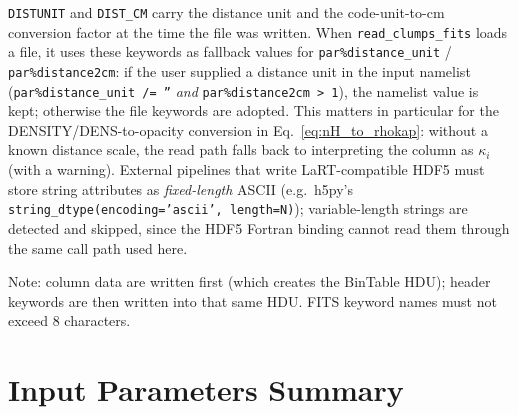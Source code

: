 \documentclass[english,a4paper]{my_memo}
\begin{document}
\texttt{DISTUNIT} and \texttt{DIST\_CM} carry the distance unit and the
code-unit-to-cm conversion factor at the time the file was written.  When
\texttt{read\_clumps\_fits} loads a file, it uses these keywords as
fallback values for \texttt{par\%distance\_unit} / \texttt{par\%distance2cm}:
if the user supplied a distance unit in the input namelist
(\texttt{par\%distance\_unit /= ''} \emph{and} \texttt{par\%distance2cm > 1}),
the namelist value is kept; otherwise the file keywords are adopted.  This
matters in particular for the DENSITY/DENS-to-opacity conversion in
Eq.~\ref{eq:nH_to_rhokap}: without a known distance scale, the read path
falls back to interpreting the column as $\kappa_i$ (with a warning).
External pipelines that write LaRT-compatible HDF5 must store string
attributes as \emph{fixed-length} ASCII (e.g.\ h5py's
\texttt{string\_dtype(encoding='ascii', length=N)}); variable-length
strings are detected and skipped, since the HDF5 Fortran binding cannot
read them through the same call path used here.

Note: column data are written first (which creates the BinTable HDU);
header keywords are then written into that same HDU.  FITS keyword names
must not exceed 8 characters.

\section{Input Parameters Summary}
\label{sec:input_params}
\end{document}
